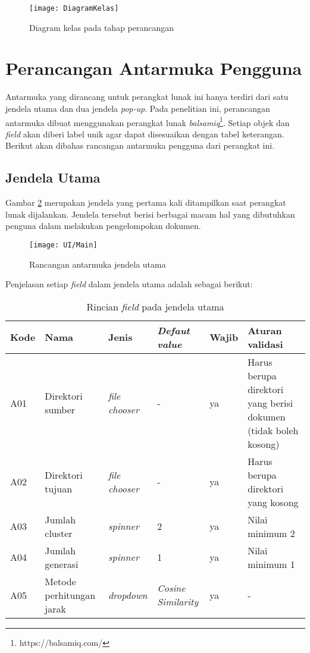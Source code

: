 \begin{figure}
	\begin{center}
		\texttt{[image: DiagramKelas]}
		\caption{Diagram kelas pada tahap perancangan}
		\label{fig:diagramkelas}
	\end{center}
\end{figure}

\newpage

\section{Perancangan Antarmuka Pengguna}
Antarmuka yang dirancang untuk perangkat lunak ini hanya terdiri dari satu jendela utama dan dua jendela \textit{pop-up}. Pada penelitian ini, perancangan antarmuka dibuat menggunakan perangkat lunak \textit{balsamiq}\footnote{https://balsamiq.com/}. Setiap objek dan \textit{field} akan diberi label unik agar dapat disesuaikan dengan tabel keterangan. Berikut akan dibahas rancangan antarmuka pengguna dari perangkat ini.

\subsection{Jendela Utama}
Gambar \ref{fig:UIUtama} merupakan jendela yang pertama kali ditampilkan saat perangkat lunak dijalankan. Jendela tersebut berisi berbagai macam hal yang dibutuhkan penguna dalam melakukan pengelompokan dokumen. 

\begin{figure}[h]
	\begin{center}
		\texttt{[image: UI/Main]}
		\caption{Rancangan antarmuka jendela utama}
		\label{fig:UIUtama}
	\end{center}
\end{figure}

Penjelasan setiap \textit{field} dalam jendela utama adalah sebagai berikut:

\begin{table}[h]
	\label{tbl:fieldUtama}
	\renewcommand{\arraystretch}{2}
	\begin{tabularx}{\textwidth}{l X l X l X} \hline
		\textbf{Kode} & \textbf{Nama} & \textbf{Jenis} & \textbf{\textit{Defaut value}} & \textbf{Wajib} & \textbf{Aturan validasi} \\ \hline
		A01 & Direktori sumber & \textit{file chooser} & - & ya & Harus berupa direktori yang berisi dokumen (tidak boleh kosong) \\ \hline
		A02 & Direktori tujuan & \textit{file chooser} & - & ya & Harus berupa direktori yang kosong \\ \hline
		A03 & Jumlah cluster & \textit{spinner} & 2 & ya & Nilai minimum 2 \\ \hline
		A04 & Jumlah generasi & \textit{spinner} & 1 & ya & Nilai minimum 1 \\ \hline
		A05 & Metode perhitungan jarak & \textit{dropdown} & \textit{Cosine Similarity} & ya & - \\ \hline
	\end{tabularx}
	\caption{Rincian \textit{field} pada jendela utama}
\end{table}


